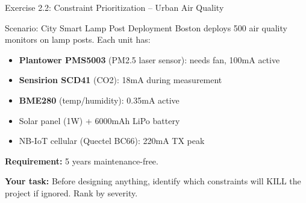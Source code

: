 \documentclass[aspectratio=169,11pt]{beamer}
\begin{document}
\begin{frame}{Exercise 2.2: Constraint Prioritization -- Urban Air Quality}
    \begin{block}{Scenario: City Smart Lamp Post Deployment}
        Boston deploys 500 air quality monitors on lamp posts. Each unit has:
        \begin{itemize}
            \item \textbf{Plantower PMS5003} (PM2.5 laser sensor): needs fan, 100mA active
            \item \textbf{Sensirion SCD41} (CO2): 18mA during measurement
            \item \textbf{BME280} (temp/humidity): 0.35mA active
            \item Solar panel (1W) + 6000mAh LiPo battery
            \item NB-IoT cellular (Quectel BC66): 220mA TX peak
        \end{itemize}
        
        \vspace{0.2cm}
        \textbf{Requirement:} 5 years maintenance-free.
        
        \textbf{Your task:} Before designing anything, identify which constraints will KILL the project if ignored. Rank by severity.
    \end{block}
\end{frame}
\end{document}
